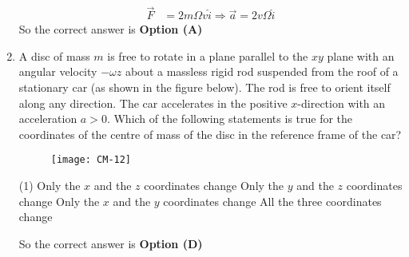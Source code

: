 \begin{enumerate}
\begin{answer}
\begin{align*}
\vec{F}&=2 m \Omega v \hat{i} \Rightarrow \vec{a}=2 v \Omega \hat{i}
\end{align*}
So the correct answer is \textbf{Option (A)}
\end{answer}
	\item A disc of mass $m$ is free to rotate in a plane parallel to the $x y$ plane with an angular velocity $-\omega \hat{z}$ about a massless rigid rod suspended from the roof of a stationary car (as shown in the figure below). The rod is free to orient itself along any direction. The car accelerates in the positive $x$-direction with an acceleration $a>0 .$ Which of the following statements is true for the coordinates of the centre of mass of the disc in the reference frame of the car?
{	}
\begin{figure}[H]
\centering
\texttt{[image: CM-12]}
\end{figure}
\begin{tasks}(1)
\task[\textbf{A.}] Only the $x$ and the $z$ coordinates change
\task[\textbf{B.}] Only the $y$ and the $z$ coordinates change
\task[\textbf{C.}] Only the $x$ and the $y$ coordinates change
\task[\textbf{D.}] All the three coordinates change
\end{tasks}
\begin{answer}
So the correct answer is \textbf{Option (D)}
\end{answer}
	
	
	
\end{enumerate}